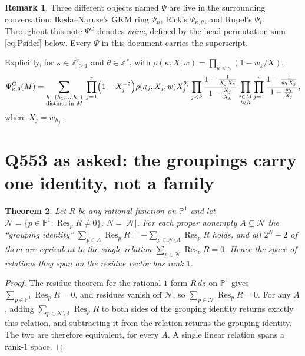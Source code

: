 \documentclass[11pt]{article}
\newtheorem{theorem}{Theorem}
\theoremstyle{definition}
\newtheorem{remark}[theorem]{Remark}
\theoremstyle{remark}
\DeclareMathOperator{\Res}{Res}
\newcommand{\PsiC}{\Psi^{\mathrm{C}}}
\begin{document}
\begin{remark}\label{rem:psi}
Three different objects named $\Psi$ are live in the surrounding conversation:
Ikeda--Naruse's GKM ring $\Psi_n$, Rick's $\Psi_{\kappa,\theta}$, and Rupel's $\Psi_i$.
Throughout this note $\PsiC$ denotes \emph{mine}, defined by the head-permutation sum
\eqref{eq:Psidef} below. Every $\Psi$ in this document carries the superscript.
\end{remark}

Explicitly, for $\kappa\in\mathbb{Z}_{\ge1}^r$ and $\theta\in\mathbb{Z}^r$, with
$\rho(\kappa,X,w)=\prod_{k<\kappa}(1-w_k/X)$,
\begin{equation}\label{eq:Psidef}
  \PsiC_{\kappa,\theta}(M)
  =\sum_{\substack{h=(h_1,\dots,h_r)\\ \text{distinct in }M}}
   \;\prod_{j=1}^{r}\Bigl(1-X_j^{-2}\Bigr)\rho(\kappa_j,X_j,w)X_j^{\theta_j}
   \prod_{j<k}\frac{1-\frac{1}{X_jX_k}}{1-\frac{X_j}{X_k}}
   \prod_{\substack{t\in M\\ t\notin h}}\prod_{j=1}^{r}\frac{1-\frac{1}{w_tX_j}}{1-\frac{w_t}{X_j}},
\end{equation}
where $X_j=w_{h_j}$.

\section{Q553 as asked: the groupings carry one identity, not a family}

\begin{theorem}\label{thm:one}
Let $R$ be any rational function on $\mathbb{P}^1$ and let
$\mathcal{N}=\{p\in\mathbb{P}^1:\Res_pR\neq0\}$, $N=|\mathcal{N}|$. For each proper
nonempty $A\subsetneq\mathcal{N}$ the ``grouping identity''
$\sum_{p\in A}\Res_pR=-\sum_{p\in\mathcal{N}\setminus A}\Res_pR$ holds, and all
$2^{N}-2$ of them are equivalent to the single relation
$\sum_{p\in\mathcal{N}}\Res_pR=0$. Hence the space of relations they span on the residue
vector has rank $1$.
\end{theorem}

\begin{proof}
The residue theorem for the rational $1$-form $R\,dz$ on $\mathbb{P}^1$ gives
$\sum_{p\in\mathbb{P}^1}\Res_pR=0$, and residues vanish off $\mathcal{N}$, so
$\sum_{p\in\mathcal{N}}\Res_pR=0$. For any $A$, adding
$\sum_{p\in\mathcal{N}\setminus A}\Res_pR$ to both sides of the grouping identity
returns exactly this relation, and subtracting it from the relation returns the grouping
identity. The two are therefore equivalent, for every $A$. A single linear relation spans
a rank-$1$ space.
\end{proof}
\end{document}
